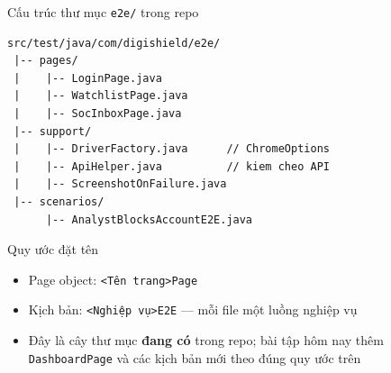 \documentclass[aspectratio=169,12pt]{beamer}
\begin{document}
\begin{frame}[fragile]{Cấu trúc thư mục \texttt{e2e/} trong repo}
\begin{lstlisting}[basicstyle=\ttfamily\scriptsize]
src/test/java/com/digishield/e2e/
 |-- pages/
 |    |-- LoginPage.java
 |    |-- WatchlistPage.java
 |    |-- SocInboxPage.java
 |-- support/
 |    |-- DriverFactory.java      // ChromeOptions
 |    |-- ApiHelper.java          // kiem cheo API
 |    |-- ScreenshotOnFailure.java
 |-- scenarios/
      |-- AnalystBlocksAccountE2E.java
\end{lstlisting}

  \begin{block}{Quy ước đặt tên}
    \begin{itemize}
      \item Page object: \texttt{<Tên trang>Page}
      \item Kịch bản: \texttt{<Nghiệp vụ>E2E} --- mỗi file một
            luồng nghiệp vụ
      \item Đây là cây thư mục \textbf{đang có} trong repo; bài tập
            hôm nay thêm \texttt{DashboardPage} và các kịch bản mới
            theo đúng quy ước trên
    \end{itemize}
  \end{block}
\end{frame}
\end{document}
